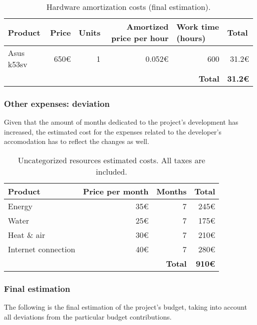\begin{table}[h]
	\centering
	\begin{tabular}{l r r r r r}
		\hline
		\textbf{Product} & \multicolumn{1}{l}{\textbf{Price}} & \multicolumn{1}{l}{\textbf{Units}} & \multicolumn{1}{p{3cm}}{\textbf{Amortized price per hour}} & \multicolumn{1}{l}{\textbf{Work time (hours)}} & \multicolumn{1}{l}{\textbf{Total}} \\ \hline
		Asus k53sv & 650€ & 1 & 0.052€ & 600 & 31.2€ \\ \hline
		&  &  &  & \textbf{Total} & \textbf{31.2€}
	\end{tabular}
	\caption{Hardware amortization costs (final estimation).}
	\label{table:hardware-resources-final}
\end{table}

\subsubsection*{Other expenses: deviation}

Given that the amount of months dedicated to the project's development has increased, the estimated cost for the expenses related to the developer's accomodation has to reflect the changes as well.

\begin{table}[h]
	\centering
	\begin{tabular}{lrrr}
		\hline
		\textbf{Product} & \multicolumn{1}{l}{\textbf{Price per month}} & \multicolumn{1}{l}{\textbf{Months}} & \multicolumn{1}{l}{\textbf{Total}} \\ \hline
		Energy & 35€ & 7 & 245€ \\
		Water & 25€ & 7 & 175€ \\
		Heat \& air & 30€ & 7 & 210€ \\
		Internet connection & 40€ & 7 & 280€ \\ \hline
		& \multicolumn{1}{l}{} & \textbf{Total} & \textbf{910€}
	\end{tabular}
	\caption{Uncategorized resources estimated costs. All taxes are included.}
	\label{table:other-resources-final}
\end{table}

\subsubsection*{Final estimation}

The following is the final estimation of the project's budget, taking into account all deviations from the particular budget contributions.

